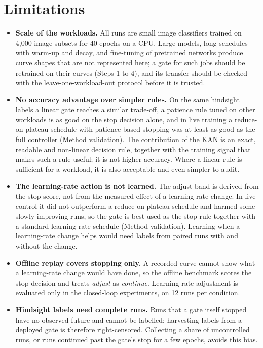 \section*{Limitations}
\begin{itemize}
\item \textbf{Scale of the workloads.} All runs are small image classifiers trained on 4{,}000-image subsets for 40 epochs on a CPU. Large models, long schedules with warm-up and decay, and fine-tuning of pretrained networks produce curve shapes that are not represented here; a gate for such jobs should be retrained on their curves (Steps 1 to 4), and its transfer should be checked with the leave-one-workload-out protocol before it is trusted.
\item \textbf{No accuracy advantage over simpler rules.} On the same hindsight labels a linear gate reaches a similar trade-off, a patience rule tuned on other workloads is as good on the stop decision alone, and in live training a reduce-on-plateau schedule with patience-based stopping was at least as good as the full controller (Method validation). The contribution of the KAN is an exact, readable and non-linear decision rule, together with the training signal that makes such a rule useful; it is not higher accuracy. Where a linear rule is sufficient for a workload, it is also acceptable and even simpler to audit.
\item \textbf{The learning-rate action is not learned.} The adjust band is derived from the stop score, not from the measured effect of a learning-rate change. In live control it did not outperform a reduce-on-plateau schedule and harmed some slowly improving runs, so the gate is best used as the stop rule together with a standard learning-rate schedule (Method validation). Learning when a learning-rate change helps would need labels from paired runs with and without the change.
\item \textbf{Offline replay covers stopping only.} A recorded curve cannot show what a learning-rate change would have done, so the offline benchmark scores the stop decision and treats \emph{adjust} as \emph{continue}. Learning-rate adjustment is evaluated only in the closed-loop experiments, on 12 runs per condition.
\item \textbf{Hindsight labels need complete runs.} Runs that a gate itself stopped have no observed future and cannot be labelled; harvesting labels from a deployed gate is therefore right-censored. Collecting a share of uncontrolled runs, or runs continued past the gate's stop for a few epochs, avoids this bias.

\end{itemize}
